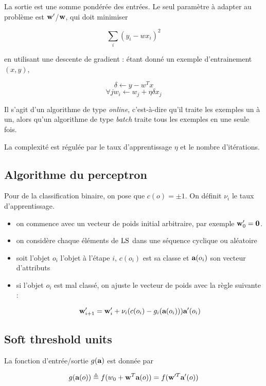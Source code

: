 	
La sortie est une somme pondérée des entrées. Le seul paramètre à adapter au problème est $\textbf{w}'$/$\textbf{w}$, qui doit minimiser
	
$$\sum_i (y_i - wx_i)^2$$

en utilisant une descente de gradient : étant donné un exemple d'entrainement $(x, y)$,

$$\delta \leftarrow y - w^Tx$$
$$\forall jw_i \leftarrow w_j + \eta \delta x_j$$

Il s'agit d'un algorithme de type \textit{online}, c'est-à-dire qu'il traite les exemples un à un, alors qu'un algorithme de type \textit{batch} traite tous les exemples en une seule fois.

La complexité est régulée par le taux d'apprentissage $\eta$ et le nombre d'itérations.

	\subsection{Algorithme du perceptron}
	
	Pour de la classification binaire, on pose que $c(o) = \pm 1$. On définit $\nu_i$ le taux d'apprentissage.
	
	\begin{itemize}
		\item on commence avec un vecteur de poids initial arbitraire, par exemple $\textbf{w}_0' = \textbf{0}$.
		\item on considère chaque éléments de $\text{LS}$ dans une séquence cyclique ou aléatoire
		
		\item soit l'objet $o_i$ l'objet à l'étape $i$, $c(o_i)$ est sa classe et $\textbf{a}(o_i)$ son vecteur d'attributs
		\item si l'objet $o_i$ est mal classé, on ajuste le vecteur de poids avec la règle suivante :
		
		$$\textbf{w}_{i + 1}' = \textbf{w}_i' + \nu_i (c(o_i) - g_i(\textbf{a}(o_i))) \textbf{a}'(o_i)$$
	\end{itemize}
	
	
	\subsection{Soft threshold units}
	
	La fonction d'entrée/sortie $g(\textbf{a})$ est donnée par
	
	$$g(\textbf{a}(o)) \triangleq f(w_0 + \textbf{w}^T\textbf{a}(o)) = f(\textbf{w}'^T \textbf{a}'(o))$$
	
